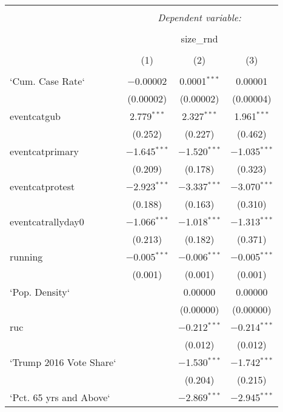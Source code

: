 
\begin{table}[!htbp] \centering 
  \caption{} 
  \label{} 
\tiny 
\begin{tabular}{@{\extracolsep{5pt}}lccc} 
\\[-1.8ex]\hline 
\hline \\[-1.8ex] 
 & \multicolumn{3}{c}{\textit{Dependent variable:}} \\ 
\cline{2-4} 
\\[-1.8ex] & \multicolumn{3}{c}{size\_rnd} \\ 
\\[-1.8ex] & (1) & (2) & (3)\\ 
\hline \\[-1.8ex] 
 `Cum. Case Rate` & $-$0.00002 & 0.0001$^{***}$ & 0.00001 \\ 
  & (0.00002) & (0.00002) & (0.00004) \\ 
  eventcatgub & 2.779$^{***}$ & 2.327$^{***}$ & 1.961$^{***}$ \\ 
  & (0.252) & (0.227) & (0.462) \\ 
  eventcatprimary & $-$1.645$^{***}$ & $-$1.520$^{***}$ & $-$1.035$^{***}$ \\ 
  & (0.209) & (0.178) & (0.323) \\ 
  eventcatprotest & $-$2.923$^{***}$ & $-$3.337$^{***}$ & $-$3.070$^{***}$ \\ 
  & (0.188) & (0.163) & (0.310) \\ 
  eventcatrallyday0 & $-$1.066$^{***}$ & $-$1.018$^{***}$ & $-$1.313$^{***}$ \\ 
  & (0.213) & (0.182) & (0.371) \\ 
  running & $-$0.005$^{***}$ & $-$0.006$^{***}$ & $-$0.005$^{***}$ \\ 
  & (0.001) & (0.001) & (0.001) \\ 
  `Pop. Density` &  & 0.00000 & 0.00000 \\ 
  &  & (0.00000) & (0.00000) \\ 
  ruc &  & $-$0.212$^{***}$ & $-$0.214$^{***}$ \\ 
  &  & (0.012) & (0.012) \\ 
  `Trump 2016 Vote Share` &  & $-$1.530$^{***}$ & $-$1.742$^{***}$ \\ 
  &  & (0.204) & (0.215) \\ 
  `Pct. 65 yrs and Above` &  & $-$2.869$^{***}$ & $-$2.945$^{***}$ \\ 

\end{tabular}
\end{table}

